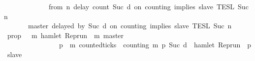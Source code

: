 \begin{isabellebody}
\isanewline
\ \ \ \ \ \ \ \ \ \ \ {\isasyminter}\ {\isasymlbrakk}\ from\ n\ delay\ count\ {\isacharparenleft}Suc\ d{\isacharparenright}\ on\ counting\ implies\ slave\ {\isasymrbrakk}\isactrlsub T\isactrlsub E\isactrlsub S\isactrlsub L\isactrlbsup {\isasymge}\ Suc\ n\isactrlesup {\isacharparenright}\isanewline
\ \ \ \ \ {\isacharparenright}\isanewline
\ \ \ \ \ {\isasyminter}\ {\isasymlbrakk}\ master\ delayed\ by\ {\isacharparenleft}Suc\ d{\isacharparenright}\ on\ counting\ implies\ slave\ {\isasymrbrakk}\isactrlsub T\isactrlsub E\isactrlsub S\isactrlsub L\isactrlbsup {\isasymge}\ Suc\ n\isactrlesup {\isacartoucheclose}\isanewline
%
\isadelimproof
%
\endisadelimproof
%
\isatagproof
{}\isamarkupfalse%
\ {\isacharminus}\isanewline
\ \ \isamarkupfalse%
\ {\isacharquery}prop\ {\isacharequal}\ {\isacartoucheopen}{\isasymlambda}{\isasymrho}\ m{\isachardot}\ hamlet\ {\isacharparenleft}{\isacharparenleft}Rep{\isacharunderscore}run\ {\isasymrho}{\isacharparenright}\ m\ master{\isacharparenright}\ {\isasymlongrightarrow}\isanewline
\ \ \ \ \ \ \ \ \ \ \ \ \ \ \ \ {\isacharparenleft}{\isasymforall}p\ {\isasymge}\ m{\isachardot}\ counted{\isacharunderscore}ticks\ {\isasymrho}\ counting\ m\ p\ {\isacharparenleft}Suc\ d{\isacharparenright}\ {\isasymlongrightarrow}\ hamlet\ {\isacharparenleft}{\isacharparenleft}Rep{\isacharunderscore}run\ {\isasymrho}{\isacharparenright}\ p\ slave{\isacharparenright}{\isacharparenright}{\isacartoucheclose}\isanewline

\end{isabellebody}
